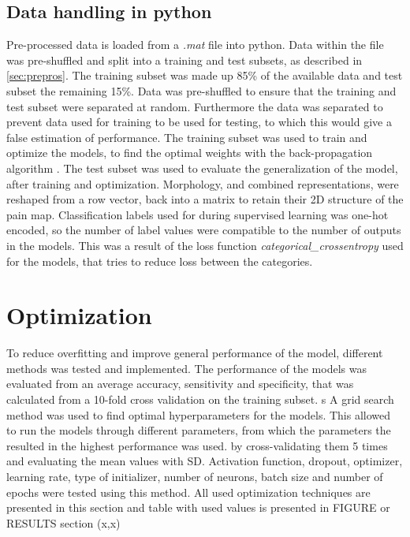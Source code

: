 \subsection{Data handling in python}
Pre-processed data is loaded from a \textit{.mat} file into python.
Data within the file was pre-shuffled and split into a training and test subsets, as described in \autoref{sec:prepros}. The training subset was made up 85\% of the available data and test subset the remaining 15\%. Data was pre-shuffled to ensure that the training and test subset were separated at random. Furthermore the data was separated to prevent data used for training to be used for testing, to which this would give a false estimation of performance.  
The training subset was used to train and optimize the models, to find the optimal weights with the back-propagation algorithm \citep{Bengio2012}. 
The test subset was used to evaluate the generalization of the model, after training and optimization.
Morphology, and combined representations, were reshaped from a row vector, back into a matrix to retain their 2D structure of the pain map.
Classification labels used for during supervised learning was one-hot encoded, so the number of label values were compatible to the number of outputs in the models. This was a result of the loss function \textit{categorical\_crossentropy} used for the models, that tries to reduce loss between the categories.    


\section{Optimization}
To reduce overfitting and improve general performance of the model, different methods was tested and implemented. 
The performance of the models was evaluated from an average accuracy, sensitivity and specificity, that was calculated from a 10-fold cross validation on the training subset. s
A grid search method was used to find optimal hyperparameters for the models. This allowed to run the models through different parameters, from which the parameters the resulted in the highest performance was used.  by cross-validating them 5 times and evaluating the mean values with SD. Activation function, dropout, optimizer, learning rate, type of initializer, number of neurons, batch size and number of epochs were tested using this method.  All used optimization techniques are presented in this section and table with used values is presented in FIGURE or RESULTS section (x,x)

